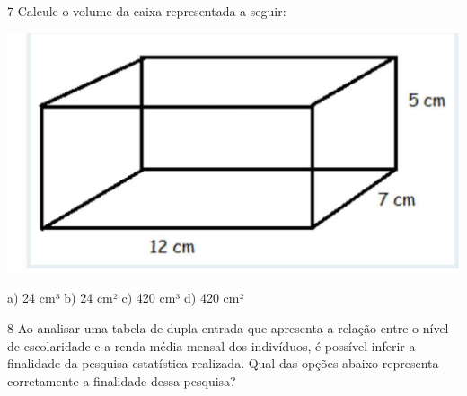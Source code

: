 
\num{7} Calcule o volume da caixa representada a seguir:

\includegraphics{./imgSAEB_7_MAT/media/image99.jpg}

a) 24 cm³ b) 24 cm² c) 420 cm³ d) 420 cm²



\num{8} Ao analisar uma tabela de dupla entrada que apresenta a relação entre
o nível de escolaridade e a renda média mensal dos indivíduos, é
possível inferir a finalidade da pesquisa estatística realizada. Qual
das opções abaixo representa corretamente a finalidade dessa pesquisa?

